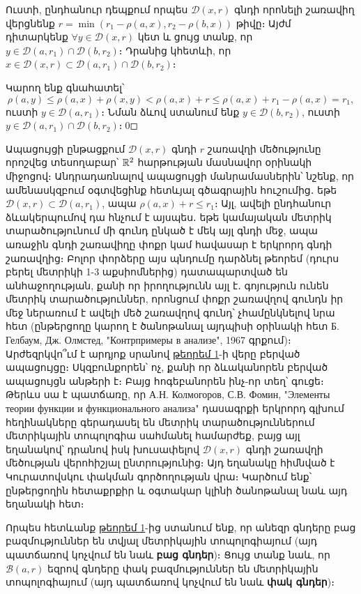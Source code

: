 \documentclass[./main.tex]{subfiles}
\begin{document}
\par Ուստի, ընդհանուր դեպքում որպես $\mathcal{D}(x,r)$ գնդի որոնելի շառավիղ վերցնենք $r=\min(r_1-\rho(a,x),r_2-\rho(b,x))$ թիվը։ Այժմ դիտարկենք $\forall y\in \mathcal{D}(x,r)$ կետ և ցույց տանք, որ $y\in \mathcal{D}(a,r_1)\cap \mathcal{D}(b,r_2)$։ Դրա\-նից կհետևի, որ $x\in \mathcal{D}(x,r)\subset \mathcal{D}(a,r_1)\cap \mathcal{D}(b,r_2)$։

\par Կարող ենք գնահատել՝ 
\[ 
\rho(a,y)\leq \rho(a,x)+\rho(x,y)<\rho(a,x)+r\leq \rho(a,x)+r_1-\rho(a,x)=r_1,
\]
ուստի $y\in \mathcal{D}(a,r_1)$։ Նման ձևով ստանում ենք $y\in \mathcal{D}(b,r_2)$, ուստի $y\in \mathcal{D}(a,r_1)\cap \mathcal{D}(b,r_2)$։\qed 

\begin{note}
Ապացույցի ընթացքում $\mathcal{D}(x,r)$ գնդի $r$ շառավղի մեծությունը որոշվեց տեսողաբար՝ $\mathbb{R}^2$ հարթության մասնավոր օրինակի միջոցով։ Անդրա\-դառ\-նալով ապացույցի մանրամասներին՝ նշենք, որ ամենասկզբում օգտվեցինք հետևյալ գծագրային հուշումից․ եթե $\mathcal{D}(x,r)\subset \mathcal{D}(a,r_1)$, ապա $\rho(a,x)+r\leq r_1$։ Այլ, ավելի ընդհանուր ձևակերպումով դա հնչում է այսպես․ եթե կամայական մետրիկ տարա\-ծու\-թյունում մի գունդ ընկած է մեկ այլ գնդի մեջ, ապա առաջին գնդի շառավիղը փոքր կամ հավասար է երկրորդ գնդի շառավղից։ Բոլոր փորձերը այս պնդումը դարձնել թեորեմ (դուրս բերել մետրիկի 1-3 աքսիոմներից) դատա\-պարտ\-ված են անհաջողության, քանի որ իրողությունն այլ է․ գոյություն ունեն մետրիկ տարա\-ծու\-թյուն\-ներ, որոնցում փոքր շառավղով գունդն իր մեջ ներառում է ավելի մեծ շառավղով գունդ՝ չհամընկնելով նրա հետ (ընթերցողը կարող է ծանոթանալ այդ\-պիսի օրինակի հետ Б. Гелбаум, Дж. Олмстед, "Контрпримеры в анализе", 1967 գրքում)։ Արժեզրկվո՞ւմ է արդյոք սրանով \hyperref[ch7thm1]{թեորեմ 1}-ի վերը բերված ապացույցը։ Սկզբունքորեն՝ ոչ, քանի որ ձևականորեն բերված ապացույցն անթերի է։ Բայց հոգեբանորեն ինչ-որ տեղ՝ գուցե։ Թերևս սա է պատճառը, որ А.Н. Колмо\-го\-ров, С.В. Фомин, "Элементы теории функции и функционального анализа" դա\-սա\-գրքի երկրորդ գլխում հեղինակները գերադասել են մետրիկ տարածություն\-ներում մետրիկային տոպոլոգիա սահմանել համարժեք, բայց այլ եղանակով՝ դրանով իսկ խուսափելով $\mathcal{D}(x,r)$ գնդի շառավղի մեծության վերոհիշյալ ընտրությունից։ Այդ եղանակը հիմնված է Կուրատովսկու փակման գործողության վրա։ Կարծում ենք՝ ընթերցողին հետաքրքիր և օգտակար կլինի ծանոթանալ նաև այդ եղանակի հետ։
\end{note}

\renewcommand*{\proofname}{\hspace{18pt}\textbf{Ապացուցում։}\nopunct}
Որպես հետևանք \hyperref[ch7thm1]{թեորեմ 1}-ից ստանում ենք, որ անեզր գնդերը բաց բազ\-մու\-թյուն\-ներ են տվյալ մետրիկային տոպոլոգիայում (այդ պատճառով կոչվում են նաև \textbf{բաց գնդեր})։ Ցույց տանք նաև, որ $\mathcal{B}(a,r)$ եզրով գնդերը փակ բազմություններ են մետրիկային տոպոլոգիայում (այդ պատճառով կոչվում են նաև \textbf{փակ գնդեր})։ 
\end{document}
